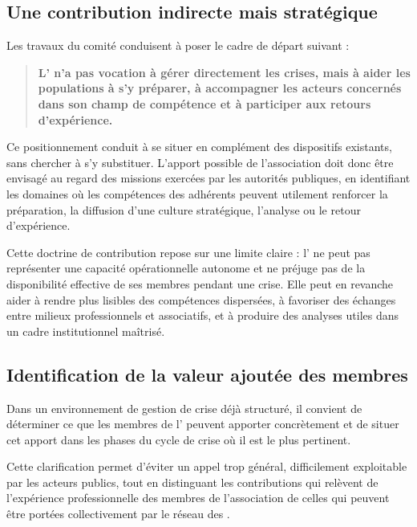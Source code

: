 \subsection{Une contribution indirecte mais stratégique}


Les travaux du comité conduisent à poser le cadre de départ suivant :

\begin{quote}
\textbf{L'\ARSeize{} n'a pas vocation à gérer directement les crises, mais à aider les populations à s'y préparer, à accompagner les acteurs concernés dans son champ de compétence et à participer aux retours d'expérience.}
\end{quote}


Ce positionnement conduit à se situer en complément des dispositifs existants, sans chercher à s'y substituer. L'apport possible de l'association doit donc être envisagé au regard des missions exercées par les autorités publiques, en identifiant les domaines où les compétences des adhérents peuvent utilement renforcer la préparation, la diffusion d'une culture stratégique, l'analyse ou le retour d'expérience.

Cette doctrine de contribution repose sur une limite claire : l'\ARSeize{} ne peut pas représenter une capacité opérationnelle autonome et ne préjuge pas de la disponibilité effective de ses membres pendant une crise. Elle peut en revanche aider à rendre plus lisibles des compétences dispersées, à favoriser des échanges entre milieux professionnels et associatifs, et à produire des analyses utiles dans un cadre institutionnel maîtrisé.

\subsection{Identification de la valeur ajoutée des membres}


Dans un environnement de gestion de crise déjà structuré, il convient de déterminer ce que les membres de l'\ARSeize{} peuvent apporter concrètement et de situer cet apport dans les phases du cycle de crise où il est le plus pertinent.

Cette clarification permet d'éviter un appel trop général, difficilement exploitable par les acteurs publics, tout en distinguant les contributions qui relèvent de l'expérience professionnelle des membres de l'association de celles qui peuvent être portées collectivement par le réseau des \AssociationsUnionIHEDN.

